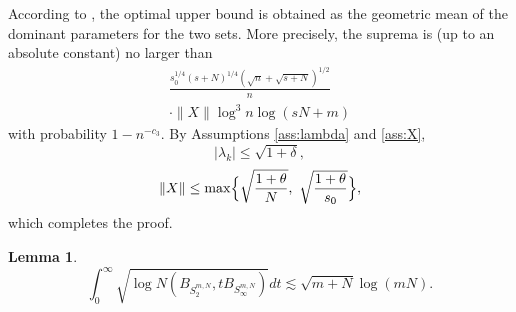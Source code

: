 \documentclass[11pt,journal]{IEEEtran}
\newcommand{\norm}[1]{\|{#1}\|}
\newtheorem{lemma}[theorem]{Lemma}
\begin{document}
\begin{IEEEproof}
According to \cite[Theorem 2.3]{Lee2015b}, the optimal upper bound is obtained as the geometric mean of the dominant parameters for the two sets. More precisely, the suprema is (up to an absolute constant) no larger than
\begin{align*}
\frac{s_0^{1/4} (s+N)^{1/4} (\sqrt{n}+\sqrt{s+N})^{1/2}}{n} \\
\cdot \norm{X} \log^3 n \log(sN+m)
\end{align*}
with probability $1 - n^{-c_3}$. By Assumptions \ref{ass:lambda} and \ref{ass:X},
\[
|\lambda_k| \leq \sqrt{1+\delta} ,
\]
\[
\norm{X} \leq \max\Bigl\{\sqrt{\frac{1+\theta}{N}},~\sqrt{\frac{1+\theta}{s_0}} \Big\},
\]
which completes the proof.
\end{IEEEproof}



\begin{lemma}
\label{lemma:entint}
\[
\int_0^\infty \sqrt{\log N(B_{S_2^{m,N}}, tB_{S_\infty^{m,N}})} dt 
\lesssim \sqrt{m+N} \log(mN).
\]
\end{lemma}
\end{document}
